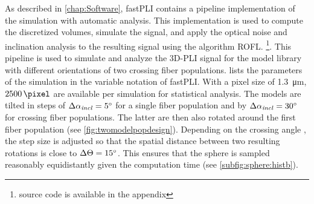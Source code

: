 %
As described in \cref{chap:Software}, \ac{fastPLI} contains a pipeline implementation of the simulation with automatic analysis.
This implementation is used to compute the discretized volumes, simulate the signal, and apply the optical noise and inclination analysis to the resulting signal using the algorithm \ac{ROFL}. \footnote{source code is available in the appendix \dummy{}}.
This pipeline is used to simulate and analyze the \ac{3D-PLI} signal for the model library with different orientations of two crossing fiber populations.
 lists the parameters of the simulation in the variable notation of \ac{fastPLI}.
With a pixel size of \SI{1.3}{\micro\meter}, $\SI{2500}{\pixel}$ are available per simulation for statistical analysis.
The models are tilted in steps of $\Delta \textnormal{$\alpha_{\mathit{incl}}$} = \SI{5}{\degree}$ for a single fiber population and by $\Delta \textnormal{$\alpha_{\mathit{incl}}$} = \SI{30}{\degree}$ for crossing fiber populations. The latter are then also rotated around the first fiber population (see \cref{fig:twomodelpopdesign}).
Depending on the crossing angle \modelOmega{}, the step size is adjusted so that the spatial distance between two resulting rotations is close to $\Delta \textnormal{$\Theta$} = \SI{15}{\degree}$.
This ensures that the sphere is sampled reasonably equidistantly given the computation time (see \cref{subfig:sphere:histb}).
%
%
%
